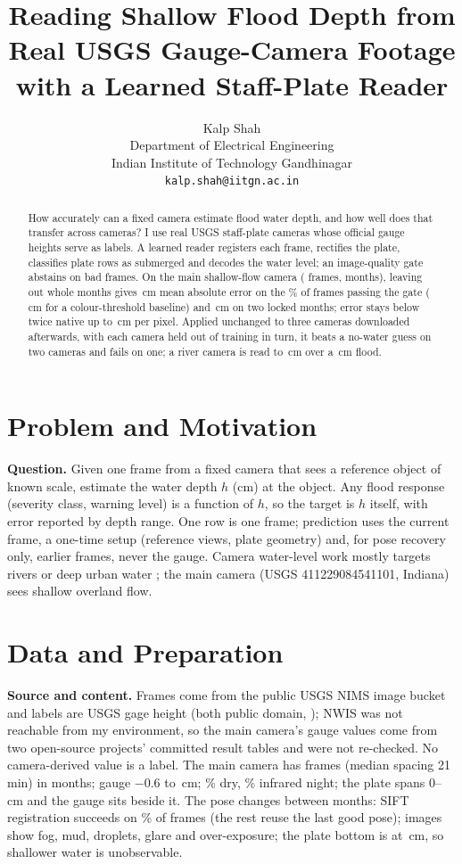 \documentclass{article}
\title{Reading Shallow Flood Depth from Real USGS Gauge-Camera Footage with a Learned Staff-Plate Reader}
\author{%
  Kalp Shah \\
  Department of Electrical Engineering \\
  Indian Institute of Technology Gandhinagar \\
  \texttt{kalp.shah@iitgn.ac.in}
}
\begin{document}
\maketitle

\begin{abstract}
How accurately can a fixed camera estimate flood water depth, and how well does that transfer across cameras? I use real USGS staff-plate cameras whose official gauge heights serve as labels. A learned reader registers each frame, rectifies the plate, classifies plate rows as submerged and decodes the water level; an image-quality gate abstains on bad frames. On the main shallow-flow camera (\nFrames{} frames, \nBlocks{} months), leaving out whole months gives \maeDevGated\,cm mean absolute error on the \covDev\% of frames passing the gate (\maeBaseDevGated\,cm for a colour-threshold baseline) and \maeLockedGated\,cm on two locked months; error stays below twice native up to \resSF\,cm per pixel. Applied unchanged to three cameras downloaded afterwards, with each camera held out of training in turn, it beats a no-water guess on two cameras and fails on one; a river camera is read to \hancMaeCal\,cm over a \hancRangeCm\,cm flood.
\end{abstract}

\section{Problem and Motivation}
\textbf{Question.} Given one frame from a fixed camera that sees a reference object of known scale, estimate the water depth $h$ (cm) at the object. Any flood response (severity class, warning level) is a function of $h$, so the target is $h$ itself, with error reported by depth range. One row is one frame; prediction uses the current frame, a one-time setup (reference views, plate geometry) and, for pose recovery only, earlier frames, never the gauge. Camera water-level work mostly targets rivers or deep urban water \citep{vandaele2021,liang2023}; the main camera (USGS 411229084541101, Indiana) sees shallow overland flow.

\section{Data and Preparation}
\textbf{Source and content.} Frames come from the public USGS NIMS image bucket and labels are USGS gage height (both public domain, \citealp{nims}); NWIS was not reachable from my environment, so the main camera's gauge values come from two open-source projects' committed result tables \citep{nims} and were not re-checked. No camera-derived value is a label. The main camera has \nFrames{} frames (median spacing 21\,min) in \nBlocks{} months; gauge $-0.6$ to \gaugeMax\,cm; \pctDry\% dry, \pctIR\% infrared night; the plate spans 0--\plateTopCm\,cm and the gauge sits beside it. The pose changes between months: SIFT registration \citep{sift} succeeds on \pctRegistered\% of frames (the rest reuse the last good pose); images show fog, mud, droplets, glare and over-exposure; the plate bottom is at \plateBottomCm\,cm, so shallower water is unobservable.
\end{document}
